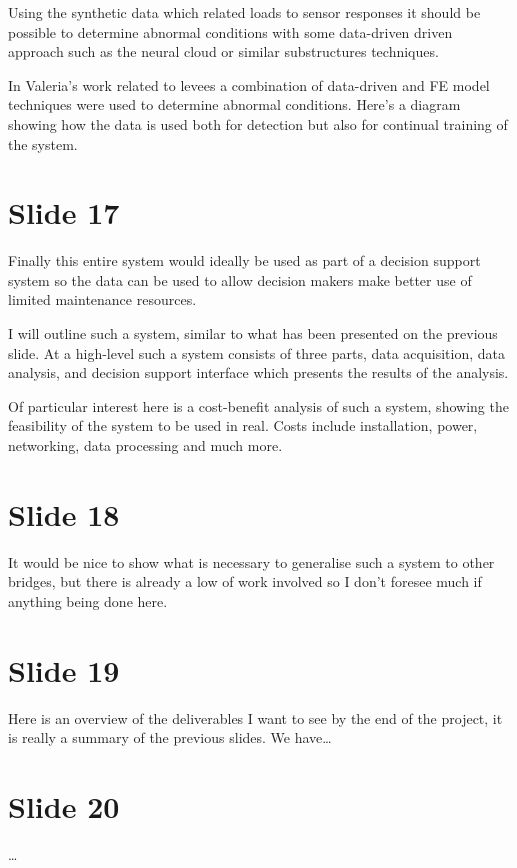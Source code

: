 \documentclass[11pt]{article}
\begin{document}
Using the synthetic data which related loads to sensor responses it should be
possible to determine abnormal conditions with some data-driven driven
approach such as the neural cloud or similar substructures techniques.

In Valeria's work related to levees a combination of data-driven and FE model
techniques were used to determine abnormal conditions. Here's a diagram
showing how the data is used both for detection but also for continual
training of the system.
\section{Slide 17}
\label{sec:org27d5ae8}
Finally this entire system would ideally be used as part of a decision support
system so the data can be used to allow decision makers make better use of
limited maintenance resources.

I will outline such a system, similar to what has been presented on the
previous slide. At a high-level such a system consists of three parts, data
acquisition, data analysis, and decision support interface which presents the
results of the analysis.

Of particular interest here is a cost-benefit analysis of such a system,
showing the feasibility of the system to be used in real. Costs include
installation, power, networking, data processing and much more.
\section{Slide 18}
\label{sec:org4a5835c}
It would be nice to show what is necessary to generalise such a system to
other bridges, but there is already a low of work involved so I don't foresee
much if anything being done here.
\section{Slide 19}
\label{sec:org332cb05}
Here is an overview of the deliverables I want to see by the end of the
project, it is really a summary of the previous slides. We have\ldots{}
\section{Slide 20}
\label{sec:orgb6888ae}
\ldots{}
\end{document}
